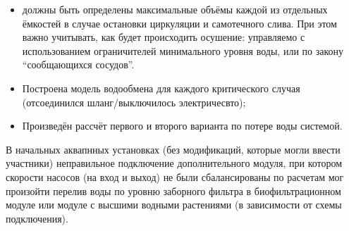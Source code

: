 \begin{enumerate}
\begin{itemize}
                \item должны быть определены максимальные объёмы каждой из отдельных ёмкостей в случае остановки циркуляции и самотечного слива. При этом важно учитывать, как будет происходить осушение: управляемо с использованием ограничителей минимального уровня воды, или по закону “сообщающихся сосудов”. 
                
                \item Построена модель водообмена для каждого критического случая (отсоединился шланг/выключилось электричесвто);
                
                \item Произведён рассчёт первого и второго варианта по потере воды системой.
                
            
            \end{itemize}    

\end{enumerate}

В начальных аквапнных установках (без модификаций, которые могли ввести участники) неправильное подключение дополнительного модуля, при котором скорости насосов (на вход и выход) не были сбалансированы по расчетам мог произойти  перелив воды по уровню заборного фильтра в биофильтрационном модуле или модуле с высшими водными растениями (в зависимости от схемы подключения). 